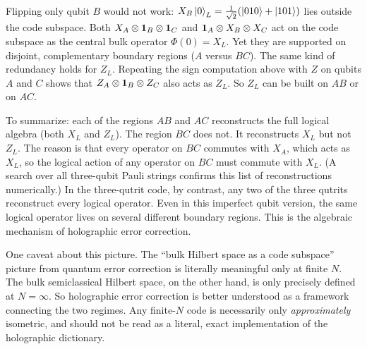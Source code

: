 Flipping only qubit $B$ would not work: $X_B\ket0_L=\tfrac1{\sqrt2}(\ket{010}+\ket{101})$ lies outside the
code subspace. Both $X_A \otimes \mathbf{1}_B \otimes \mathbf{1}_C$ and $\mathbf{1}_A \otimes X_B \otimes X_C$ act on the code
subspace as the central bulk operator $\Phi(0) = X_L$. Yet they are supported on disjoint, complementary
boundary regions ($A$ versus $BC$). The same kind of redundancy holds for $Z_L$. Repeating the sign computation
above with $Z$ on qubits $A$ and $C$ shows that $Z_A\otimes\mathbf{1}_B\otimes Z_C$ also acts as $Z_L$. So $Z_L$ can
be built on $AB$ or on $AC$.

To summarize: each of the regions $AB$ and $AC$ reconstructs the full logical algebra (both $X_L$ and $Z_L$).
The region $BC$ does not. It reconstructs $X_L$ but not $Z_L$. The reason is that every operator on $BC$
commutes with $X_A$, which acts as $X_L$, so the logical action of any operator on $BC$ must commute with
$X_L$. (A search over all three-qubit Pauli strings confirms this list of reconstructions numerically.) In the
three-qutrit code, by contrast, any two of the three qutrits reconstruct every logical operator. Even in this
imperfect qubit version, the same logical operator lives on several different boundary regions. This is the
algebraic mechanism of holographic error correction.

One caveat about this picture. The ``bulk Hilbert space as a code subspace'' picture from quantum error
correction is literally meaningful only at finite $N$. The bulk semiclassical Hilbert space, on the other hand,
is only precisely defined at $N=\infty$. So holographic error correction is better understood as a framework
connecting the two regimes. Any finite-$N$ code is necessarily only \emph{approximately} isometric, and should
not be read as a literal, exact implementation of the holographic dictionary.

